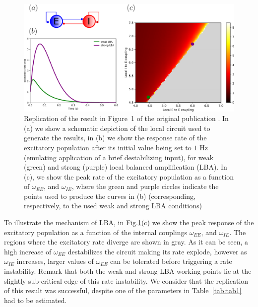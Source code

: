 \begin{figure}[!ht]
 \centering
 \includegraphics[scale=0.4]{figures/fig1.pdf}
 \caption{Replication of the result in Figure~1 of the original publication \cite{joglekar2018inter}. In (a) we show a schematic depiction of the local circuit used to generate the results, in (b) we show the response rate of the excitatory population after its initial value being set to $1$ Hz (emulating application of a brief destabilizing input), for weak (green) and strong (purple) local balanced amplification (LBA). In (c), we show the peak rate of the excitatory population as a function of $\omega_{EE}$, and $\omega_{IE}$, where the green and purple circles indicate the points used to produce the curves in (b) (corresponding, respectively, to the used weak and strong LBA conditions) }\label{fig:fig1}
\end{figure}

To illustrate the mechanism of LBA, in Fig.\ref{fig:fig1}(c) we show the peak response of the excitatory population as a function of the internal couplings $\omega_{EE}$, and $\omega_{IE}$. The regions where the excitatory rate diverge are shown in gray. As it can be seen, a high increase of $\omega_{EE}$ destabilizes the circuit making its rate explode, however as $\omega_{IE}$ increases, larger values of  $\omega_{EE}$ can be tolerated before triggering a rate instability. Remark that both the weak and strong LBA working points lie at the slightly sub-critical edge of this rate instability. We consider that the replication of this result was successful, despite one of the parameters in Table~\ref{tab:tab1} had to be estimated.

